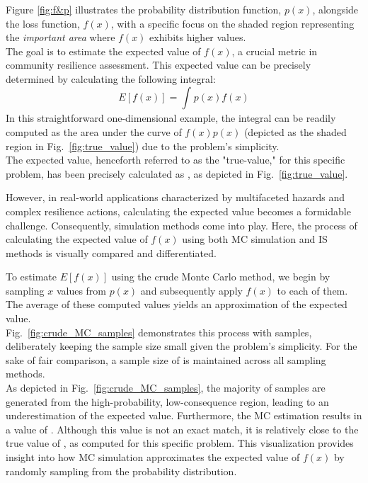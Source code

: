     Figure \ref{fig:f&p} illustrates the probability distribution function, $p(x)$, alongside the loss function, $f(x)$, with a specific focus on the shaded region representing the \textit{important area} where $f(x)$ exhibits higher values. \\
    The goal is to estimate the expected value of $f(x)$, a crucial metric in community resilience assessment. This expected value can be precisely determined by calculating the following integral:
    $$E[f(x)]=\int_{}^{}p(x)f(x)$$
    In this straightforward one-dimensional example, the integral can be readily computed as the area under the curve of $f(x)p(x)$ (depicted as the shaded region in Fig.~\ref{fig:true_value}) due to the problem's simplicity. \\
    The expected value, henceforth referred to as the "true-value," for this specific problem, has been precisely calculated as \TrueValue, as depicted in Fig.~\ref{fig:true_value}.
    
    

    However, in real-world applications characterized by multifaceted hazards and complex resilience actions, calculating the expected value becomes a formidable challenge. Consequently, simulation methods come into play. Here, the process of calculating the expected value of $f(x)$ using both MC simulation and IS methods is visually compared and differentiated.
    
    To estimate $E[f(x)]$ using the crude Monte Carlo method, we begin by sampling $x$ values from $p(x)$ and subsequently apply $f(x)$ to each of them. The average of these computed values yields an approximation of the expected value.\\ Fig.~\ref{fig:crude_MC_samples} demonstrates this process with \SampleSize{} samples, deliberately keeping the sample size small given the problem's simplicity. For the sake of fair comparison, a sample size of \SampleSize{} is maintained across all sampling methods.\\

    

    As depicted in Fig.~\ref{fig:crude_MC_samples}, the majority of samples are generated from the high-probability, low-consequence region, leading to an underestimation of the expected value. Furthermore, the MC estimation results in a value of \MCResult. Although this value is not an exact match, it is relatively close to the true value of \TrueValue, as computed for this specific problem. This visualization provides insight into how MC simulation approximates the expected value of $f(x)$ by randomly sampling from the probability distribution.
    
